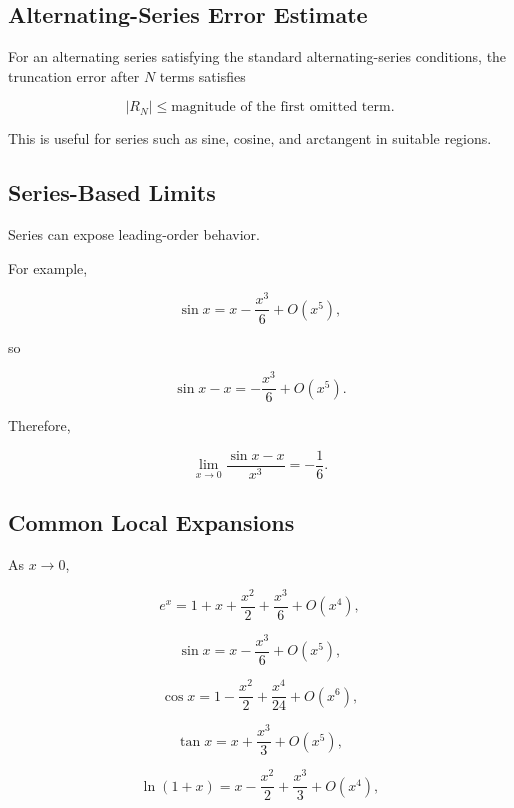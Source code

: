 \subsection{Alternating-Series Error Estimate}
\label{subsec:alternating-series-error-reference}

For an alternating series satisfying the standard alternating-series
conditions, the truncation error after \(N\) terms satisfies

\[
\boxed{
|R_N|
\leq
\text{magnitude of the first omitted term}.
}
\]

This is useful for series such as sine, cosine, and arctangent in suitable
regions.

\subsection{Series-Based Limits}
\label{subsec:series-based-limits-reference}

Series can expose leading-order behavior.

For example,

\[
\sin x
=
x-\frac{x^3}{6}+O(x^5),
\]

so

\[
\sin x-x
=
-\frac{x^3}{6}+O(x^5).
\]

Therefore,

\[
\boxed{
\lim_{x\to0}
\frac{
\sin x-x
}{
x^3
}
=
-\frac16.
}
\]

\subsection{Common Local Expansions}
\label{subsec:common-local-expansions}

As \(x\to0\),

\[
\boxed{
e^x
=
1+x+\frac{x^2}{2}
+\frac{x^3}{6}
+O(x^4),
}
\]

\[
\boxed{
\sin x
=
x-\frac{x^3}{6}
+O(x^5),
}
\]

\[
\boxed{
\cos x
=
1-\frac{x^2}{2}
+\frac{x^4}{24}
+O(x^6),
}
\]

\[
\boxed{
\tan x
=
x+\frac{x^3}{3}
+O(x^5),
}
\]

\[
\boxed{
\ln(1+x)
=
x-\frac{x^2}{2}
+\frac{x^3}{3}
+O(x^4),
}
\]

